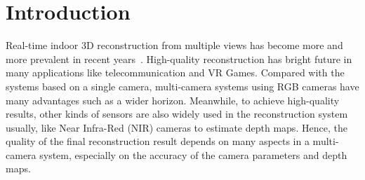 
\section{Introduction}
Real-time indoor 3D reconstruction from multiple views has become more and more prevalent in recent years~\cite{dou2016fusion4d,orts2016holoportation}. High-quality reconstruction has bright future in many applications like telecommunication and VR Games. Compared with the systems based on a single camera, multi-camera systems using RGB cameras have many advantages such as a wider horizon. Meanwhile, to achieve high-quality results, other kinds of sensors are also widely used in the reconstruction system usually, like Near Infra-Red (NIR) cameras to estimate depth maps. Hence, the quality of the final reconstruction result depends on many aspects in a multi-camera system, especially on the accuracy of the camera parameters and depth maps.


